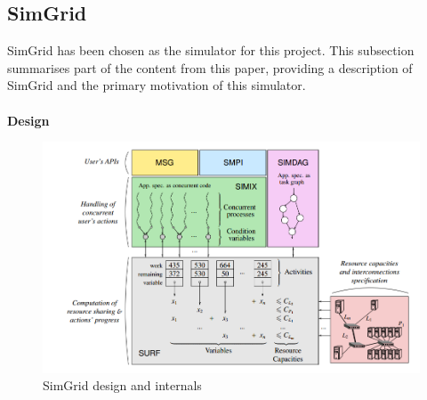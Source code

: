 \documentclass[a4paper,11pt]{article}
\begin{document}
\subsection{SimGrid}

SimGrid has been chosen as the simulator for this project. This subsection summarises part of the content from this paper\cite{simulation}, providing a description of SimGrid and the primary motivation of this simulator.
\\\\
\textbf{Design}

\begin{figure}[H]
	\centering
	\includegraphics[scale=0.7]{images/simgrid}
	\caption{SimGrid design and internals\cite{simulation}}
\end{figure}
\end{document}
